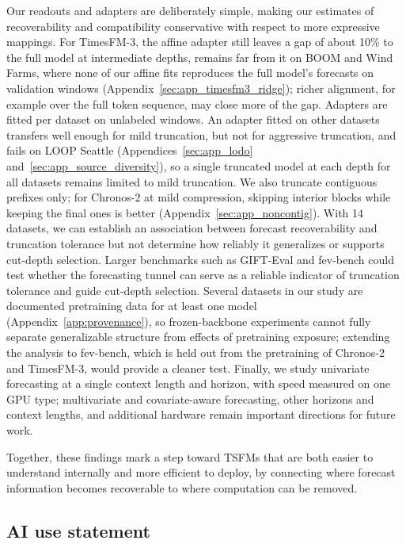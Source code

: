 \documentclass{article} %
\begin{document}
Our readouts and adapters are deliberately simple, making our estimates of recoverability and compatibility conservative with respect to more expressive mappings. For TimesFM-3, the affine adapter still leaves a gap of about 10\% to the full model at intermediate depths, remains far from it on BOOM and Wind Farms, where none of our affine fits reproduces the full model's forecasts on validation windows (Appendix~\ref{sec:app_timesfm3_ridge}); richer alignment, for example over the full token sequence, may close more of the gap. Adapters are fitted per dataset on unlabeled windows. An adapter fitted on other datasets transfers well enough for mild truncation, but not for aggressive truncation, and fails on LOOP Seattle (Appendices~\ref{sec:app_lodo} and~\ref{sec:app_source_diversity}), so a single truncated model at each depth for all datasets remains limited to mild truncation. We also truncate contiguous prefixes only; for Chronos-2 at mild compression, skipping interior blocks while keeping the final ones is better (Appendix~\ref{sec:app_noncontig}). With 14 datasets, we can establish an association between forecast recoverability and truncation tolerance but not determine how reliably it generalizes or supports cut-depth selection. Larger benchmarks such as GIFT-Eval \citep{aksu2024giftevalbenchmarkgeneraltime} and fev-bench \citep{shchur2026fevbenchrealisticbenchmarktime} could test whether the forecasting tunnel can serve as a reliable indicator of truncation tolerance and guide cut-depth selection. Several datasets in our study are documented pretraining data for at least one model (Appendix~\ref{app:provenance}), so frozen-backbone experiments cannot fully separate generalizable structure from effects of pretraining exposure; extending the analysis to fev-bench, which is held out from the pretraining of Chronos-2 and TimesFM-3, would provide a cleaner test. Finally, we study univariate forecasting at a single context length and horizon, with speed measured on one GPU type; multivariate and covariate-aware forecasting, other horizons and context lengths, and additional hardware remain important directions for future work.

Together, these findings mark a step toward TSFMs that are both easier to understand internally and more efficient to deploy, by connecting where forecast information becomes recoverable to where computation can be removed.

\subsection*{AI use statement}
\end{document}
